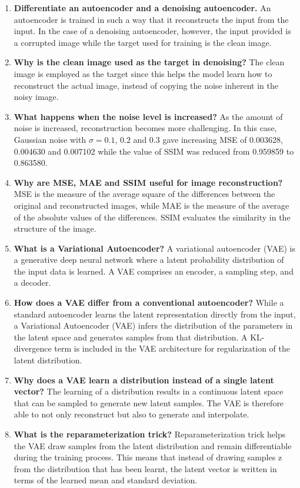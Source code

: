 \documentclass[10pt]{article}
\begin{document}
\begin{enumerate}
\item \textbf{Differentiate an autoencoder and a denoising autoencoder.}
An autoencoder is trained in such a way that it reconstructs the input from the input. In the case of a denoising autoencoder, however, the input provided is a corrupted image while the target used for training is the clean image.

\item \textbf{Why is the clean image used as the target in denoising?}
The clean image is employed as the target since this helps the model learn how to reconstruct the actual image, instead of copying the noise inherent in the noisy image.

\item \textbf{What happens when the noise level is increased?}
As the amount of noise is increased, reconstruction becomes more challenging. In this case, Gaussian noise with $\sigma=0.1$, $0.2$ and $0.3$ gave increasing MSE of 0.003628, 0.004630 and 0.007102 while the value of SSIM was reduced from 0.959859 to 0.863580.

\item \textbf{Why are MSE, MAE and SSIM useful for image reconstruction?}
MSE is the measure of the average square of the differences between the original and reconstructed images, while MAE is the measure of the average of the absolute values of the differences. SSIM evaluates the similarity in the structure of the image.

\item \textbf{What is a Variational Autoencoder?}
A variational autoencoder (VAE) is a generative deep neural network where a latent probability distribution of the input data is learned. A VAE comprises an encoder, a sampling step, and a decoder.
\item \textbf{How does a VAE differ from a conventional autoencoder?}
While a standard autoencoder learns the latent representation directly from the input, a Variational Autoencoder (VAE) infers the distribution of the parameters in the latent space and generates samples from that distribution. A KL-divergence term is included in the VAE architecture for regularization of the latent distribution.
\item \textbf{Why does a VAE learn a distribution instead of a single latent vector?}
The learning of a distribution results in a continuous latent space that can be sampled to generate new latent samples. The VAE is therefore able to not only reconstruct but also to generate and interpolate.
\item \textbf{What is the reparameterization trick?}
Reparameterization trick helps the VAE draw samples from the latent distribution and remain differentiable during the training process. This means that instead of drawing samples z from the distribution that has been learnt, the latent vector is written in terms of the learned mean and standard deviation.


\end{enumerate}
\end{document}
